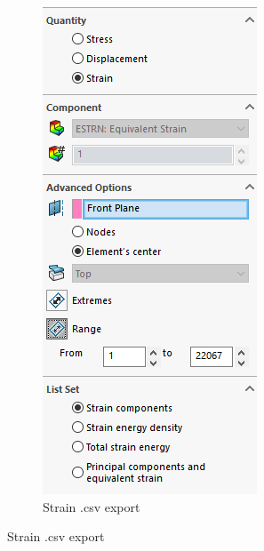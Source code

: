 \documentclass[12pt, letterpaper]{article}
\begin{document}
\begin{figure}[H]
\begin{subfigure}[t]{.3\linewidth}
	\end{subfigure}
	\begin{subfigure}[t]{.3\linewidth}
		\caption{Strain .csv export}
		\includegraphics[width=\linewidth]{./procedure/strain-list}

\end{subfigure}
\end{figure}
\end{document}

